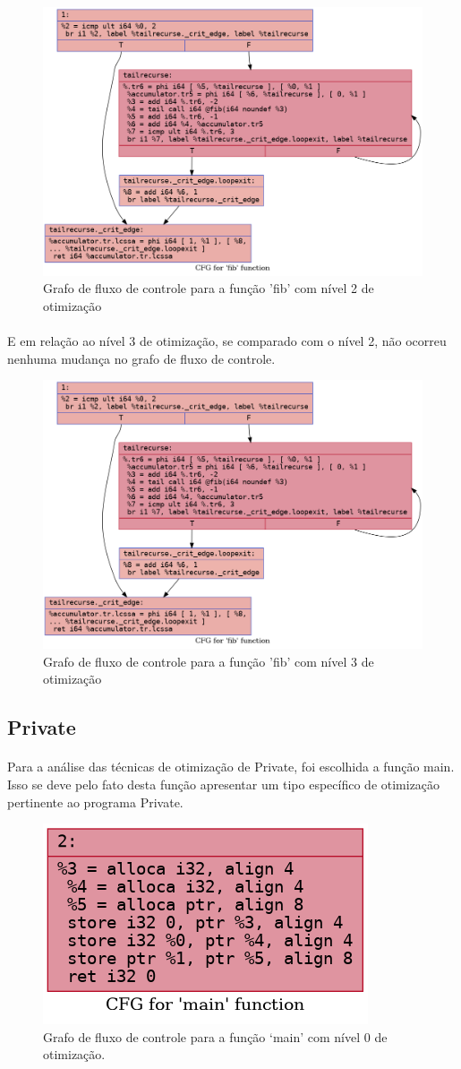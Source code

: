 \documentclass[12pt]{article}
\begin{document}
\begin{figure}
    \centering
    \includegraphics[width=0.5\linewidth]{fib2_.fib_O2.png}
    \caption{Grafo de fluxo de controle para a função 'fib' com nível 2 de otimização}
\end{figure}

\paragraph{}E em relação ao nível 3 de otimização, se comparado com o nível 2, não ocorreu nenhuma mudança no grafo de fluxo de controle.

\begin{figure}
    \centering
    \includegraphics[width=0.5\linewidth]{fib2_.fib_O3.png}
    \caption{Grafo de fluxo de controle para a função 'fib' com nível 3 de otimização}
\end{figure}

\subsection{Private}

\paragraph{}Para a análise das técnicas de otimização de Private, foi escolhida a função main. Isso se deve pelo fato desta função apresentar um tipo específico de otimização pertinente ao programa Private.

\begin{figure}
    \centering
    \includegraphics[width=0.5\linewidth]{private_.main_O0.png}
    \caption{Grafo de fluxo de controle para a função ‘main’ com nível 0 de otimização.}
\end{figure}
\end{document}
